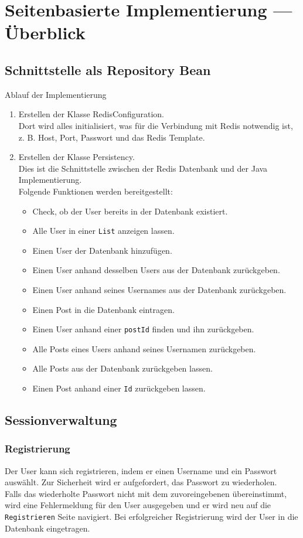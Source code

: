 \chapter{Seitenbasierte Implementierung --- Überblick}
\section{Schnittstelle als Repository Bean}
Ablauf der Implementierung
\begin{enumerate}
  \item Erstellen der Klasse RedisConfiguration. \\
  Dort wird alles initialisiert, was für die Verbindung mit Redis notwendig ist, z. B. Host, Port, Passwort und das Redis Template.
  \item Erstellen der Klasse Persistency. \\
  Dies ist die Schnittstelle zwischen der Redis Datenbank und der Java Implementierung. \\
  Folgende Funktionen werden bereitgestellt:
  \begin{itemize}
    \item Check, ob der User bereits in der Datenbank existiert.
    \item Alle User in einer \texttt{List} anzeigen lassen.
    \item Einen User der Datenbank hinzufügen.
    \item Einen User anhand desselben Users aus der Datenbank zurückgeben.
    \item Einen User anhand seines Usernames aus der Datenbank zurückgeben.
    \item Einen Post in die Datenbank eintragen.
    \item Einen User anhand einer \texttt{postId} finden und ihn zurückgeben.
    \item Alle Posts eines Users anhand seines Usernamen zurückgeben.
    \item Alle Posts aus der Datenbank zurückgeben lassen.
    \item Einen Post anhand einer \texttt{Id} zurückgeben lassen.
  \end{itemize}
\end{enumerate}

\newpage
\section{Sessionverwaltung}
\subsection{Registrierung}
Der User kann sich registrieren, indem er einen Username und ein Passwort auswählt. Zur Sicherheit wird er aufgefordert, das Passwort zu wiederholen. \\
Falls das wiederholte Passwort nicht mit dem zuvoreingebenen übereinstimmt, wird eine Fehlermeldung für den User ausgegeben und er wird neu auf die \texttt{Registrieren} Seite navigiert.
Bei erfolgreicher Registrierung wird der User in die Datenbank eingetragen.

